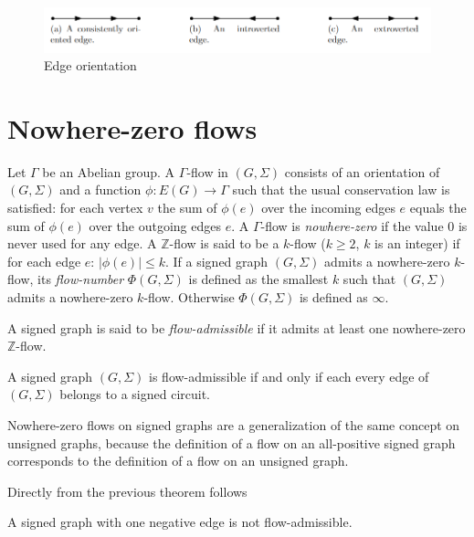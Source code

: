 \begin{figure}[ht]\label{fig:edge-orientation}
    \centering
    \includegraphics[scale=0.65]{images/oriented-edges.png}
    \caption{Edge orientation}
\end{figure}

\section{Nowhere-zero flows}

Let $\Gamma$ be an Abelian group. A $\Gamma$-flow in $(G, \Sigma)$ consists of an orientation of $(G, \Sigma)$ and 
a function $\phi : E(G) \rightarrow \Gamma$ such that the usual conservation law is satisfied: 
for each vertex $v$ the sum of $\phi (e)$ over the incoming edges $e$ equals the sum of $\phi (e)$ over the outgoing edges $e$\cite{nowhere-zero-flows-survey}.
A $\Gamma$-flow is \textit{nowhere-zero} if the value $0$ is never used for any edge.
A $\mathbb{Z}$-flow is said to be a $k$-flow ($k \geq 2$, $k$ is an integer) if for each edge $e$: $|\phi (e)| \leq k$.
If a signed graph $(G, \Sigma)$ admits a nowhere-zero $k$-flow, its \textit{flow-number} $\Phi (G, \Sigma)$ is defined as the smallest $k$ such that $(G, \Sigma)$ admits a nowhere-zero $k$-flow.
Otherwise $\Phi (G, \Sigma)$ is defined as $\infty$.

A signed graph is said to be \textit{flow-admissible} if it admits at least one nowhere-zero $\mathbb{Z}$-flow.

\begin{theorem}
    A signed graph $(G, \Sigma)$ is flow-admissible if and only if each every edge of $(G, \Sigma)$ belongs to a signed circuit.
\end{theorem}

Nowhere-zero flows on signed graphs are a generalization of the same concept on unsigned graphs, 
because the definition of a flow on an all-positive signed graph corresponds to the definition of a flow on an unsigned graph.

Directly from the previous theorem follows 

\begin{corollary}\label{one-negative-edge-flow}
    A signed graph with one negative edge is not flow-admissible.
\end{corollary}

